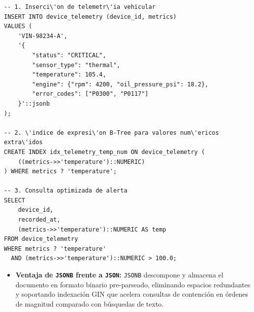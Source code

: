 \begin{lstlisting}[style=sqlstyle, caption={Indexaci\'on especializada sobre campos JSONB anidados}]
-- 1. Inserci\'on de telemetr\'ia vehicular
INSERT INTO device_telemetry (device_id, metrics)
VALUES (
    'VIN-98234-A',
    '{
        "status": "CRITICAL",
        "sensor_type": "thermal",
        "temperature": 105.4,
        "engine": {"rpm": 4200, "oil_pressure_psi": 18.2},
        "error_codes": ["P0300", "P0117"]
    }'::jsonb
);

-- 2. \'indice de expresi\'on B-Tree para valores num\'ericos extra\'idos
CREATE INDEX idx_telemetry_temp_num ON device_telemetry (
    ((metrics->>'temperature')::NUMERIC)
) WHERE metrics ? 'temperature';

-- 3. Consulta optimizada de alerta
SELECT
    device_id,
    recorded_at,
    (metrics->>'temperature')::NUMERIC AS temp
FROM device_telemetry
WHERE metrics ? 'temperature'
  AND (metrics->>'temperature')::NUMERIC > 100.0;
\end{lstlisting}

\begin{engtip}
\begin{itemize}
    \item \textbf{Ventaja de \texttt{JSONB} frente a \texttt{JSON}:} \texttt{JSONB} descompone y almacena el documento en formato binario pre-parseado, eliminando espacios redundantes y soportando indexaci\'on GIN que acelera consultas de contenci\'on en \'ordenes de magnitud comparado con b\'usquedas de texto.
\end{itemize}
\end{engtip}
